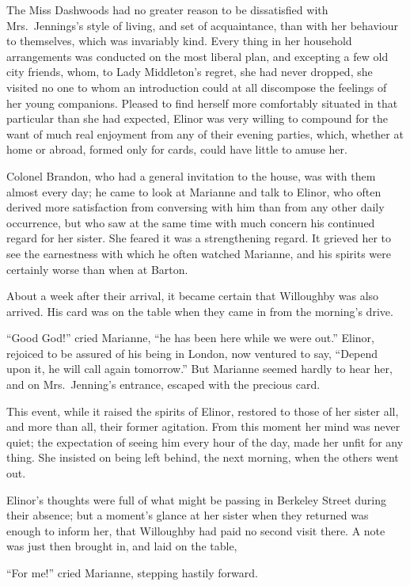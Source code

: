 \documentclass{article}
\begin{document}
The Miss Dashwoods had no greater reason to be
dissatisfied with Mrs.\ Jennings's style of living, and set
of acquaintance, than with her behaviour to themselves,
which was invariably kind.  Every thing in her household
arrangements was conducted on the most liberal plan,
and excepting a few old city friends, whom, to Lady
Middleton's regret, she had never dropped, she visited
no one to whom an introduction could at all discompose
the feelings of her young companions.  Pleased to find
herself more comfortably situated in that particular than
she had expected, Elinor was very willing to compound
for the want of much real enjoyment from any of their
evening parties, which, whether at home or abroad,
formed only for cards, could have little to amuse her.

Colonel Brandon, who had a general invitation
to the house, was with them almost every day; he came
to look at Marianne and talk to Elinor, who often derived
more satisfaction from conversing with him than from any
other daily occurrence, but who saw at the same time
with much concern his continued regard for her sister.
She feared it was a strengthening regard.  It grieved her
to see the earnestness with which he often watched Marianne,
and his spirits were certainly worse than when at Barton.

About a week after their arrival, it became
certain that Willoughby was also arrived.  His card
was on the table when they came in from the morning's drive.

``Good God!'' cried Marianne, ``he has been here while
we were out.''  Elinor, rejoiced to be assured of his
being in London, now ventured to say, ``Depend upon it,
he will call again tomorrow.''  But Marianne seemed
hardly to hear her, and on Mrs.\ Jenning's entrance,
escaped with the precious card.

This event, while it raised the spirits of Elinor,
restored to those of her sister all, and more than all,
their former agitation.  From this moment her mind was
never quiet; the expectation of seeing him every hour
of the day, made her unfit for any thing.  She insisted
on being left behind, the next morning, when the others
went out.

Elinor's thoughts were full of what might be passing
in Berkeley Street during their absence; but a moment's
glance at her sister when they returned was enough to
inform her, that Willoughby had paid no second visit there.
A note was just then brought in, and laid on the table,

``For me!'' cried Marianne, stepping hastily forward.
\end{document}

